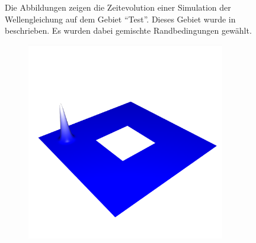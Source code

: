 \documentclass[crop=false,10pt,ngerman]{standalone}
\begin{document}
\begin{figure}[p]
\begin{subfigure}[b]{0.24\textwidth}
          \caption{}
        \end{subfigure}
        \caption[Wellensimulation auf dem Testgebiet]{%
          Die Abbildungen zeigen die Zeitevolution einer Simulation der Wellengleichung auf dem Gebiet \enquote{Test}.
          Dieses Gebiet wurde in \cite{Alberty1998} beschrieben.
          Es wurden dabei gemischte Randbedingungen gewählt.
        }
        \label{fig:test-wave}
      \end{figure}

      \begin{figure}[p]
        \center
        \begin{subfigure}[b]{0.24\textwidth}
          \center
          \includegraphics[trim={0.9cm 1.8cm 0.5cm 5cm},clip,width=0.95\textwidth]{images/ring_wave_0.png}
          \caption{}
        \end{subfigure}
        \begin{subfigure}[b]{0.24\textwidth}
          \center

\end{subfigure}
\end{figure}
\end{document}
